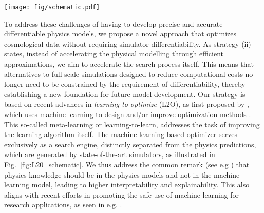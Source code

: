 \begin{figure*}
    \centering
    \texttt{[image: fig/schematic.pdf]}
    \vspace{-2.5em}
    \caption{High-level overview of \texttt{LULO} (Learning the Universe by Learning to Optimize) which aims to fit complex models to data by reconstructing the three-dimensional initial conditions. The process consists of two components: 1) applying a high-fidelity physics simulator $\mathscr{S}$, and 2) updating the initial conditions to minimize discrepancies $\Delta \ve{d}$ between the simulator output and the data. Importantly, any simulator model, including fully non-linear and non-differentiable ones, is supported. The neural optimizer, pre-trained via a supervised approach to learn how to map data discrepancies to updates in the initial conditions, proposes an update direction $\Delta \ve{x}$ across all initial condition voxels simultaneously. In the current implementation, the step size $\gamma_t$ is optimized via a line search algorithm that requires running the simulator (i.e., $\gamma_t=\gamma_t(\mathscr{S}, \Delta \mathbf{x}_t)$; see details in sections~\ref{sec:update_direction}). The iterative process continues until the simulation output aligns with the data, as shown in the $2d$-slices after eight optimization steps. The slices show the evolved non-linear dark matter density field in a cubic box with side length $250h^{-1}$ Mpc and the corresponding dark matter halo field as produced by a non-differentiable spherical overdensity algorithm.}
    \label{fig:L20_schematic}
\end{figure*}

To address these challenges of having to develop precise and accurate differentiable physics models, we propose a novel approach that optimizes cosmological data without requiring simulator differentiability. As strategy (ii) states, instead of accelerating the physical modelling through efficient approximations, we aim to accelerate the search process itself. This means that alternatives to full-scale simulations designed to reduce computational costs no longer need to be constrained by the requirement of differentiability, thereby establishing a new foundation for future model development. Our strategy is based on recent advances in \textit{learning to optimize} (L2O), as first proposed by \citet{Andrychowicz2016,Chen2016}, which uses machine learning to design and/or improve optimization methods \citep[also see reviews by][]{Chen2021a,Hospedales2022}. This so-called meta-learning or learning-to-learn, addresses the task of improving the learning algorithm itself. The machine-learning-based optimizer serves exclusively as a search engine, distinctly separated from the physics predictions, which are generated by state-of-the-art simulators, as illustrated in Fig.~\ref{fig:L20_schematic}. We thus address the common remark (see e.g \citet{Huertas-Company2022}) that physics knowledge should be in the physics models and not in the machine learning model, leading to higher interpretability and explainability. This also aligns with recent efforts in promoting the safe use of machine learning for research applications, as seen in e.g. \citet{Bartlett2024, Holzschuh2024}.

